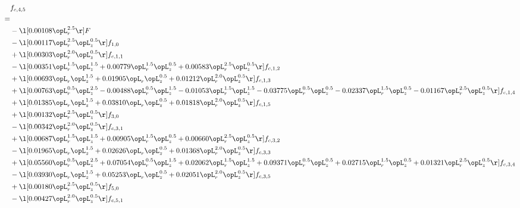 \begin{alignat}{2} 
\label{eq:f_45_1} 
& f_{c,4,5} \nonumber \\ 
 = \\ 
& - \l[  0.00108 \opL_r^{2.5}  \r] F \nonumber \\ 
& - \l[  0.00117 \opL_r^{2.5} \opL_z^{0.5}  \r] f_{1,0} \nonumber \\ 
& + \l[  0.00303 \opL_r^{2.0} \opL_z^{0.5}  \r] f_{c,1,1} \nonumber \\ 
& - \l[  0.00351 \opL_r^{1.5} \opL_z^{1.5} +  0.00779 \opL_r^{1.5} \opL_z^{0.5} +  0.00583 \opL_r^{2.5} \opL_z^{0.5}  \r] f_{c,1,2} \nonumber \\ 
& + \l[  0.00693 \opL_r \opL_z^{1.5} +  0.01905 \opL_r \opL_z^{0.5} +  0.01212 \opL_r^{2.0} \opL_z^{0.5}  \r] f_{c,1,3} \nonumber \\ 
& + \l[  0.00763 \opL_r^{0.5} \opL_z^{2.5}   -0.00488 \opL_r^{0.5} \opL_z^{1.5}   -0.01053 \opL_r^{1.5} \opL_z^{1.5}   -0.03775 \opL_r^{0.5} \opL_z^{0.5}   -0.02337 \opL_r^{1.5} \opL_z^{0.5}   -0.01167 \opL_r^{2.5} \opL_z^{0.5}  \r] f_{c,1,4} \nonumber \\ 
& + \l[  0.01385 \opL_r \opL_z^{1.5} +  0.03810 \opL_r \opL_z^{0.5} +  0.01818 \opL_r^{2.0} \opL_z^{0.5}  \r] f_{c,1,5} \nonumber \\ 
& + \l[  0.00132 \opL_r^{2.5} \opL_z^{0.5}  \r] f_{3,0} \nonumber \\ 
& - \l[  0.00342 \opL_r^{2.0} \opL_z^{0.5}  \r] f_{c,3,1} \nonumber \\ 
& + \l[  0.00687 \opL_r^{1.5} \opL_z^{1.5} +  0.00905 \opL_r^{1.5} \opL_z^{0.5} +  0.00660 \opL_r^{2.5} \opL_z^{0.5}  \r] f_{c,3,2} \nonumber \\ 
& - \l[  0.01965 \opL_r \opL_z^{1.5} +  0.02626 \opL_r \opL_z^{0.5} +  0.01368 \opL_r^{2.0} \opL_z^{0.5}  \r] f_{c,3,3} \nonumber \\ 
& + \l[  0.05560 \opL_r^{0.5} \opL_z^{2.5} +  0.07054 \opL_r^{0.5} \opL_z^{1.5} +  0.02062 \opL_r^{1.5} \opL_z^{1.5} +  0.09371 \opL_r^{0.5} \opL_z^{0.5} +  0.02715 \opL_r^{1.5} \opL_z^{0.5} +  0.01321 \opL_r^{2.5} \opL_z^{0.5}  \r] f_{c,3,4} \nonumber \\ 
& - \l[  0.03930 \opL_r \opL_z^{1.5} +  0.05253 \opL_r \opL_z^{0.5} +  0.02051 \opL_r^{2.0} \opL_z^{0.5}  \r] f_{c,3,5} \nonumber \\ 
& + \l[  0.00180 \opL_r^{2.5} \opL_z^{0.5}  \r] f_{5,0} \nonumber \\ 
& - \l[  0.00427 \opL_r^{2.0} \opL_z^{0.5}  \r] f_{c,5,1} \nonumber \\ 

\end{alignat}
